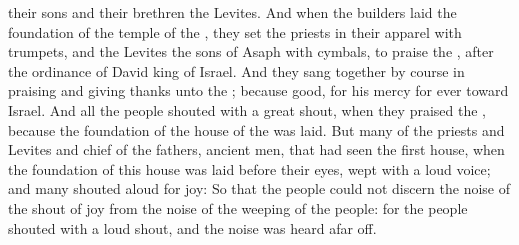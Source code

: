 {{} their
sons and their
brethren the
Levites.
And when the
builders laid the
foundation of the
temple of the
{}, they
set the
priests in their
apparel with
trumpets, and the
Levites the
sons of
Asaph with
cymbals, to
praise the
{}, after the
ordinance of
David
king of
Israel.
And they sang together by
course in
praising and giving
thanks unto the
{}; because
{}
good, for his
mercy
{} for
ever toward
Israel. And all the
people
shouted with a
great
shout, when they
praised the
{}, because the
foundation of the
house of the
{} was
laid.
But
many of the
priests and
Levites and
chief of the
fathers,
{} ancient
men, that had
seen the
first
house, when the
foundation of this
house was
laid before their
eyes,
wept with a
loud
voice; and
many
shouted
aloud for
joy:
So that the
people could not
discern the
noise of the
shout of
joy from the
noise of the
weeping of the
people: for the
people
shouted with a
loud
shout, and the
noise was
heard afar
off.

}
